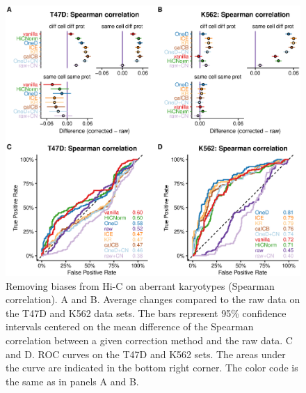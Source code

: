 \documentclass[12pt]{report}
\begin{document}
\begin{figure}
	\centerline{\includegraphics[width=\textwidth]{nar_figures/supp_figure_4.eps}}
    \caption{Removing biases from Hi-C on aberrant karyotypes (Spearman
correlation). A and B. Average changes compared to the raw data on the
T47D and K562 data sets. The bars represent 95\% confidence intervals
centered on the mean difference of the Spearman correlation between a
given correction method and the raw data. C and D. ROC curves on the T47D
and K562 sets. The areas under the curve are indicated in the bottom right
corner. The color code is the same as in panels A and B.}
\end{figure}
\end{document}
